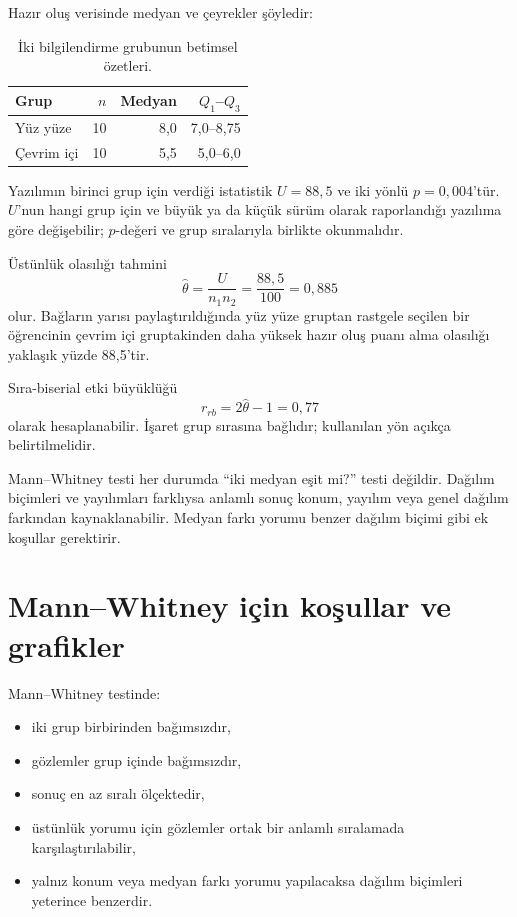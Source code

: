 Hazır oluş verisinde medyan ve çeyrekler şöyledir:

\begin{table}[htbp]
\centering
\caption{İki bilgilendirme grubunun betimsel özetleri.}
\begin{tabular}{@{}lrrr@{}}
\toprule
Grup & $n$ & Medyan & $Q_1$--$Q_3$ \\
\midrule
Yüz yüze & 10 & 8,0 & 7,0--8,75 \\
Çevrim içi & 10 & 5,5 & 5,0--6,0 \\
\bottomrule
\end{tabular}
\end{table}

Yazılımın birinci grup için verdiği istatistik $U=88{,}5$ ve iki yönlü
$p=0{,}004$'tür. $U$'nun hangi grup için ve büyük ya da küçük sürüm olarak
raporlandığı yazılıma göre değişebilir; $p$-değeri ve grup sıralarıyla birlikte
okunmalıdır.

Üstünlük olasılığı tahmini
\[
\hat\theta=\frac{U}{n_1n_2}
=\frac{88{,}5}{100}=0{,}885
\]
olur. Bağların yarısı paylaştırıldığında yüz yüze gruptan rastgele seçilen bir
öğrencinin çevrim içi gruptakinden daha yüksek hazır oluş puanı alma olasılığı
yaklaşık yüzde 88,5'tir.

Sıra-biserial etki büyüklüğü
\[
r_{rb}=2\hat\theta-1=0{,}77
\]
olarak hesaplanabilir. İşaret grup sırasına bağlıdır; kullanılan yön açıkça
belirtilmelidir.

\begin{mistakebox}
Mann--Whitney testi her durumda ``iki medyan eşit mi?'' testi değildir.
Dağılım biçimleri ve yayılımları farklıysa anlamlı sonuç konum, yayılım veya
genel dağılım farkından kaynaklanabilir. Medyan farkı yorumu benzer dağılım
biçimi gibi ek koşullar gerektirir.
\end{mistakebox}

\section{Mann--Whitney için koşullar ve grafikler}

Mann--Whitney testinde:

\begin{itemize}
  \item iki grup birbirinden bağımsızdır,
  \item gözlemler grup içinde bağımsızdır,
  \item sonuç en az sıralı ölçektedir,
  \item üstünlük yorumu için gözlemler ortak bir anlamlı sıralamada karşılaştırılabilir,
  \item yalnız konum veya medyan farkı yorumu yapılacaksa dağılım biçimleri yeterince benzerdir.
\end{itemize}

